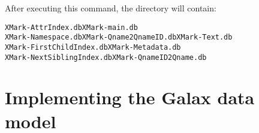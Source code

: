 
After executing this command, the   directory will contain:
\begin{alltt}
XMark-AttrIndex.db	  XMark-main.db      
XMark-Namespace.db	  XMark-Qname2QnameID.db	XMark-Text.db
XMark-FirstChildIndex.db  XMark-Metadata.db  
XMark-NextSiblingIndex.db	XMark-QnameID2Qname.db
\end{alltt}

\section{Implementing the Galax data model}

